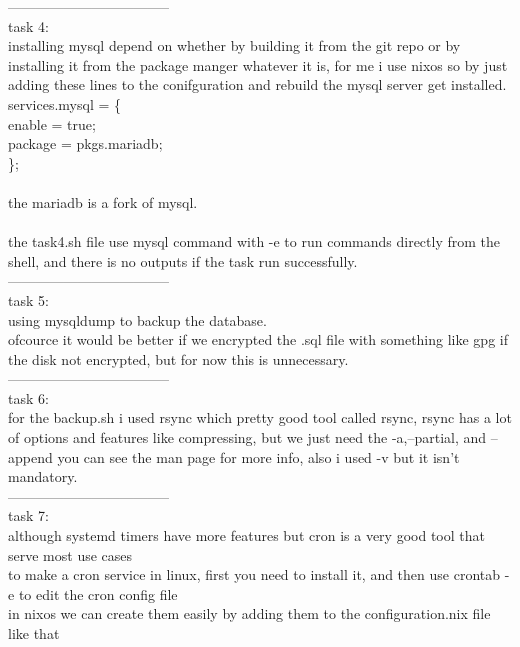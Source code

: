 \documentclass[a4paper,14pt]{extarticle}
\begin{document}
-----------------------------------\\
\newpage
task 4:\\
installing mysql depend on whether by building it from the git repo or by installing it from the package manger whatever it is, for me i use nixos so by just adding these lines to the conifguration and rebuild the mysql server get installed.\\
services.mysql = \{\\
  enable = true;\\
  package = pkgs.mariadb;\\
\};\\
\\
the mariadb is a fork of mysql.\\
\\
the task4.sh file use mysql command with -e to run commands directly from the shell, and there is no outputs if the task run successfully.\\
-----------------------------------\\
task 5:\\
using mysqldump to backup the database.\\ofcource it would be better if we encrypted the .sql file with something like gpg if the disk not encrypted, but for now this is unnecessary.\\
-----------------------------------\\
task 6:\\
for the backup.sh i used rsync which pretty good tool called rsync, rsync has a lot of options and features like compressing, but we just need the -a,--partial, and --append you can see the man page for more info, also i used -v but it isn't mandatory.\\
-----------------------------------\\
task 7:\\
although systemd timers have more features but cron is a very good tool that serve most use cases\\
to make a cron service in linux, first you need to install it, and then use crontab -e to edit the cron config file\\
in nixos we can create them easily by adding them to the configuration.nix file like that \\
\end{document}
